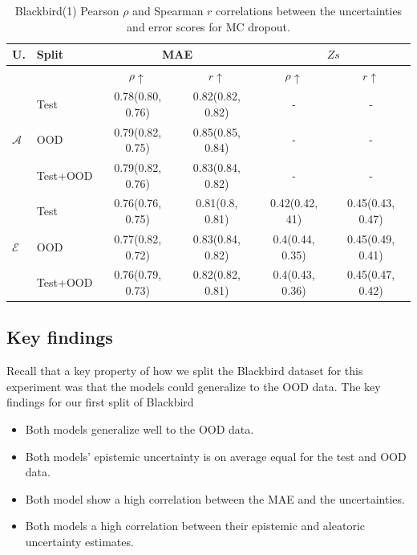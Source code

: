 \begin{table}[ht]
\centering
    \begin{tabular}{l l c c c c}  
        \toprule
        U. & Split & \multicolumn{2}{c}{MAE} & \multicolumn{2}{c}{$Zs$}\\
        \midrule
        & & $\rho \uparrow$ & $r \uparrow$ & $\rho \uparrow$ & $r \uparrow$ \\
        \multirow{3}{*}{$\mathcal{A}$} 
            & Test     & 0.78(0.80, 0.76) & 0.82(0.82, 0.82) & - & - \\  
            & OOD      & 0.79(0.82, 0.75) & 0.85(0.85, 0.84) & - & - \\  
            & Test+OOD & 0.79(0.82, 0.76) & 0.83(0.84, 0.82) & - & - \\ 

        \midrule
        \multirow{3}{*}{$\mathcal{E}$} 
            & Test     & 0.76(0.76, 0.75) & 0.81(0.8, 0.81) &  0.42(0.42, 41)  & 0.45(0.43, 0.47) \\  
            & OOD      & 0.77(0.82, 0.72) & 0.83(0.84, 0.82) &  0.4(0.44, 0.35) & 0.45(0.49, 0.41) \\
            & Test+OOD & 0.76(0.79, 0.73) & 0.82(0.82, 0.81) &  0.4(0.43, 0.36) & 0.45(0.47, 0.42) \\ 

        \toprule
    \end{tabular}
    \caption{Blackbird(1) Pearson $\rho$ and Spearman $r$ correlations between the uncertainties and error scores for MC dropout.}
    \label{tbl:bb1_dropout_corr}
\end{table}

\subsection{Key findings}

Recall that a key property of how we split the Blackbird dataset for this experiment was that the models could generalize to the OOD data. The key findings for our first split of Blackbird

\begin{itemize}
    \item Both models generalize well to the OOD data.
    \item Both models' epistemic uncertainty is on average equal for the test and OOD data.
    \item Both model show a high correlation between the MAE and the uncertainties.
    \item Both models a high correlation between their epistemic and aleatoric uncertainty estimates. 
\end{itemize}{}

